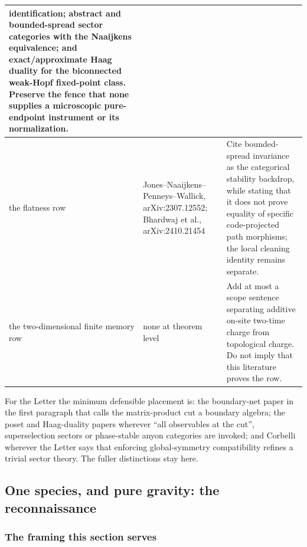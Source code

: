 {\begin{longtable}{@{}p{}p{}p{}@{}}
identification; abstract and bounded-spread sector categories with the
Naaijkens equivalence; and exact/approximate Haag duality for the biconnected
weak-Hopf fixed-point class. Preserve the fence that none supplies a
microscopic pure-endpoint instrument or its normalization. \\
\midrule
the flatness row &
Jones--Naaijkens--Penneys--Wallick, arXiv:2307.12552; Bhardwaj et al.,
arXiv:2410.21454 &
Cite bounded-spread invariance as the categorical stability backdrop, while
stating that it does not prove equality of specific code-projected path
morphisms; the local cleaning identity remains separate. \\
\midrule
the two-dimensional finite memory row &
none at theorem level &
Add at most a scope sentence separating additive on-site two-time charge from
topological charge. Do not imply that this literature proves the row. \\
\end{longtable}
}

\noindent For the Letter the minimum defensible placement is: the boundary-net
paper in the first paragraph that calls the matrix-product cut a boundary
algebra; the poset and Haag-duality papers wherever ``all observables at the
cut'', superselection sectors or phase-stable anyon categories are invoked; and
Corbelli wherever the Letter says that enforcing global-symmetry compatibility
refines a trivial sector theory. The fuller distinctions stay here.


\subsection{One species, and pure gravity: the reconnaissance}
\label{sec:op-one-species}

\subsubsection*{The framing this section serves}

